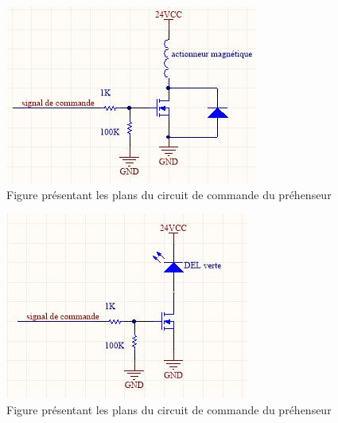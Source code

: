 \begin{figure}[htbp]
\centering
\includegraphics[scale=0.5]{fig/prehenseur.jpg}
\caption{Figure présentant les plans du circuit de commande du préhenseur}
\label{fig:prehenseur}
\end{figure}

\begin{figure}[htbp]
\centering
\includegraphics[scale=0.5]{fig/del_verte.jpg}
\caption{Figure présentant les plans du circuit de commande du préhenseur}
\label{fig:del_verte}
\end{figure}